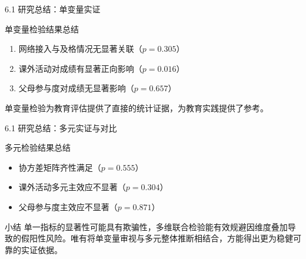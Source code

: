 \documentclass{beamer}
\newenvironment{block*}
  {\setbeamercolor{block title}{bg=white,fg=white}%
   \begin{block}{}}
  {\end{block}}
\begin{document}
\begin{frame}{6.1 研究总结：单变量实证}
    \begin{block}{单变量检验结果总结}
        \begin{enumerate}
            \item[\(\times\)] 网络接入与及格情况无显著关联（\(p=0.305\)）
            \item[\(\checkmark\)] 课外活动对成绩有显著正向影响（\(p=0.016\)）
            \item[\(\times\)] 父母参与度对成绩无显著影响（\(p=0.657\)）
        \end{enumerate}
    \end{block}

    \vspace{0.5cm}

    \begin{block*}
        单变量检验为教育评估提供了直接的统计证据，为教育实践提供了参考。
    \end{block*}
\end{frame}

\begin{frame}{6.1 研究总结：多元实证与对比}
    \begin{block}{多元检验结果总结}
        \begin{itemize}
        \item[\(\checkmark\)] 协方差矩阵齐性满足（\(p=0.555\)）
        
        \item[\(\times\)] 课外活动多元主效应不显著（\(p=0.304\)）
        
        \item[\(\times\)] 父母参与度主效应不显著（\(p=0.871\)）
        \end{itemize}
    \end{block}

    \vspace{0.5cm}

    \begin{alertblock}{小结}
        单一指标的显著性可能具有欺骗性，多维联合检验能有效规避因维度叠加导致的假阳性风险。唯有将单变量审视与多元整体推断相结合，方能得出更为稳健可靠的实证依据。
    \end{alertblock}
\end{frame}

\end{document}
